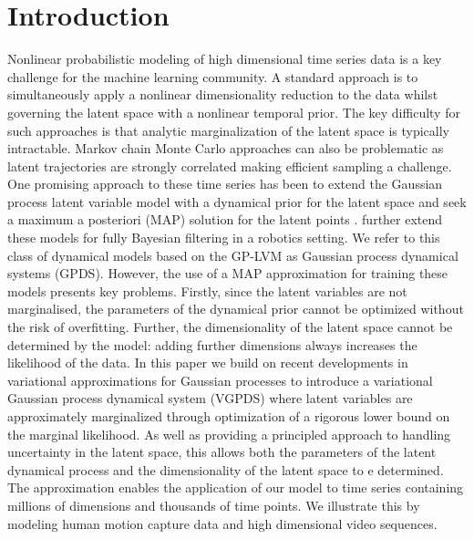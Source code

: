 \documentclass{article} %
\begin{document}
\section{Introduction}

Nonlinear probabilistic modeling of high dimensional time series data
is a key challenge for the machine learning community. A standard
approach is to simultaneously apply a nonlinear dimensionality
reduction to the data whilst governing the latent space with a
nonlinear temporal prior. The key difficulty for such approaches is
that analytic marginalization of the latent space is typically
intractable. Markov chain Monte Carlo approaches can also be
problematic as latent trajectories are strongly correlated making
efficient sampling a challenge. One promising approach to these time
series has been to extend the Gaussian process latent variable model
\cite{GPLVM,GPLVM2} with a dynamical prior for the latent space and
seek a maximum a posteriori (MAP) solution for the latent points
\cite{GPDM,Wang:gpdm08,hgplvm}. \cite{GP-Based} further extend these
models for fully Bayesian filtering in a robotics setting. We refer to
this class of dynamical models based on the GP-LVM as Gaussian process
dynamical systems (GPDS). However, the use of a MAP approximation for
training these models presents key problems.  Firstly, since the
latent variables are not marginalised, the parameters of the dynamical
prior cannot be optimized without the risk of overfitting.
Further, the dimensionality of the latent space cannot be determined
by the model: adding further dimensions always increases the
likelihood of the data. In this paper we build on recent developments
in variational approximations for Gaussian processes
\cite{Titsias09,BayesianGPLVM} to introduce a variational Gaussian
process dynamical system (VGPDS) where latent variables are
approximately marginalized through optimization of a rigorous lower
bound on the marginal likelihood.  As well as providing a principled
approach to handling uncertainty in the latent space, this allows both
the parameters of the latent dynamical process and the dimensionality
of the latent space to e determined. The approximation enables the
application of our model to time series containing millions of
dimensions and thousands of time points. We illustrate this by
modeling human motion capture data and high dimensional video
sequences.
\end{document}

